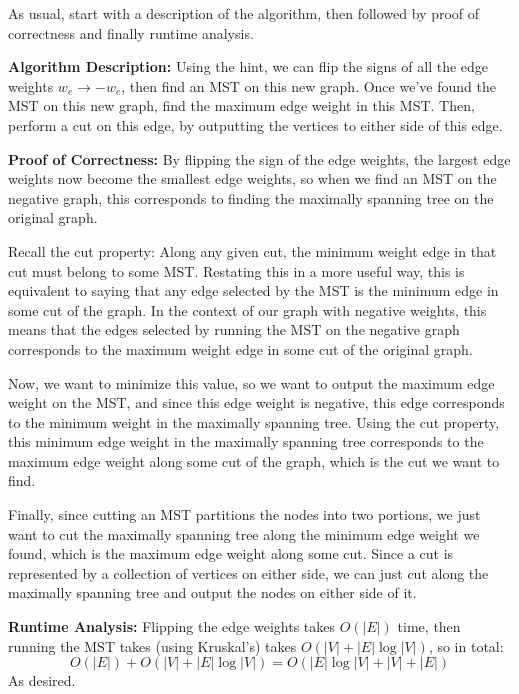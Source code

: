 \documentclass[11pt]{article}
\begin{document}
\begin{solution}
	As usual, start with a description of the algorithm, then followed by proof of correctness and 
	finally runtime analysis.

	\textbf{Algorithm Description:} Using the hint, we can flip the signs of all
	the edge weights $w_e \to -w_e$, then find an MST on this 
	new graph. Once we've found the MST on this new graph, find the maximum edge weight in this MST. Then, 
	perform a cut on this edge, by outputting the vertices to either side of this edge.  

	\textbf{Proof of Correctness:} By flipping the sign of the edge weights, the largest
	edge weights now become the smallest edge weights, so when we find an MST on the negative graph, this 
	corresponds to finding the maximally spanning tree on the original graph.

	Recall the cut property: Along any given cut, the minimum weight edge in that cut must belong to 
	some MST. Restating this in a more useful way, this is equivalent to saying that any edge selected
	by the MST is the minimum edge in some cut of the graph. In the context of our graph with 
	negative weights, this means that the edges selected by running the MST on the negative graph corresponds 
	to the maximum weight edge in some cut of the original graph. 

	Now, we want to minimize this value, so we want to output the maximum edge weight on the MST, and since 
	this edge weight is negative, this edge corresponds to the minimum weight in the maximally spanning tree.
	Using the cut property, this minimum edge weight in the maximally spanning tree corresponds to the 
	maximum edge weight along some cut of the graph, which is the cut we want to find.

	Finally, since cutting an MST partitions the nodes into two portions, we just want to cut the maximally
	spanning tree along the minimum edge weight we found, which is the maximum edge weight along some cut. 
	Since a cut is represented by a collection of vertices on either side, we can just cut along the maximally 
	spanning tree and output the nodes on either side of it. 
	
	\textbf{Runtime Analysis:} Flipping the edge weights takes $O(|E|)$ time, then running the MST takes 
	(using Kruskal's) takes $O(|V| + |E| \log |V|)$, so in total:
	\[
	O(|E|) + O(|V| + |E| \log |V|) = O(|E| \log |V| + |V| + |E|)
	\] 
	As desired. 
\end{solution}
\end{document}
